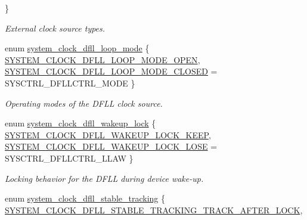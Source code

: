 \begin{DoxyCompactItemize}
 \}
\begin{DoxyCompactList}\small\item\em External clock source types. \end{DoxyCompactList}\item 
enum \mbox{\hyperlink{group__asfdoc__sam0__system__clock__group_gaf264d9ce05843104cb8a393b1d9ddfa2}{system\+\_\+clock\+\_\+dfll\+\_\+loop\+\_\+mode}} \{ \mbox{\hyperlink{group__asfdoc__sam0__system__clock__group_ggaf264d9ce05843104cb8a393b1d9ddfa2a3d9e15bfd0803e41da1f59f8b699184a}{S\+Y\+S\+T\+E\+M\+\_\+\+C\+L\+O\+C\+K\+\_\+\+D\+F\+L\+L\+\_\+\+L\+O\+O\+P\+\_\+\+M\+O\+D\+E\+\_\+\+O\+P\+EN}}, 
\mbox{\hyperlink{group__asfdoc__sam0__system__clock__group_ggaf264d9ce05843104cb8a393b1d9ddfa2a1a18e1d9233792ba5e4663c978d7a46b}{S\+Y\+S\+T\+E\+M\+\_\+\+C\+L\+O\+C\+K\+\_\+\+D\+F\+L\+L\+\_\+\+L\+O\+O\+P\+\_\+\+M\+O\+D\+E\+\_\+\+C\+L\+O\+S\+ED}} = S\+Y\+S\+C\+T\+R\+L\+\_\+\+D\+F\+L\+L\+C\+T\+R\+L\+\_\+\+M\+O\+DE
 \}
\begin{DoxyCompactList}\small\item\em Operating modes of the D\+F\+LL clock source. \end{DoxyCompactList}\item 
enum \mbox{\hyperlink{group__asfdoc__sam0__system__clock__group_ga6ce68deec62f12bb85ddb2f8c103ada5}{system\+\_\+clock\+\_\+dfll\+\_\+wakeup\+\_\+lock}} \{ \mbox{\hyperlink{group__asfdoc__sam0__system__clock__group_gga6ce68deec62f12bb85ddb2f8c103ada5abbfd6c5e90f1ee8e9865723f6c1da64e}{S\+Y\+S\+T\+E\+M\+\_\+\+C\+L\+O\+C\+K\+\_\+\+D\+F\+L\+L\+\_\+\+W\+A\+K\+E\+U\+P\+\_\+\+L\+O\+C\+K\+\_\+\+K\+E\+EP}}, 
\mbox{\hyperlink{group__asfdoc__sam0__system__clock__group_gga6ce68deec62f12bb85ddb2f8c103ada5a291a819f86924e0d60fc5a2a14b5456c}{S\+Y\+S\+T\+E\+M\+\_\+\+C\+L\+O\+C\+K\+\_\+\+D\+F\+L\+L\+\_\+\+W\+A\+K\+E\+U\+P\+\_\+\+L\+O\+C\+K\+\_\+\+L\+O\+SE}} = S\+Y\+S\+C\+T\+R\+L\+\_\+\+D\+F\+L\+L\+C\+T\+R\+L\+\_\+\+L\+L\+AW
 \}
\begin{DoxyCompactList}\small\item\em Locking behavior for the D\+F\+LL during device wake-\/up. \end{DoxyCompactList}\item 
enum \mbox{\hyperlink{group__asfdoc__sam0__system__clock__group_gaf9b0eb010541f1d7c8af3eeb0573043d}{system\+\_\+clock\+\_\+dfll\+\_\+stable\+\_\+tracking}} \{ \mbox{\hyperlink{group__asfdoc__sam0__system__clock__group_ggaf9b0eb010541f1d7c8af3eeb0573043da4a92b58e1ea9c95123b83aa6ee4e3f21}{S\+Y\+S\+T\+E\+M\+\_\+\+C\+L\+O\+C\+K\+\_\+\+D\+F\+L\+L\+\_\+\+S\+T\+A\+B\+L\+E\+\_\+\+T\+R\+A\+C\+K\+I\+N\+G\+\_\+\+T\+R\+A\+C\+K\+\_\+\+A\+F\+T\+E\+R\+\_\+\+L\+O\+CK}}, 

\end{DoxyCompactItemize}
